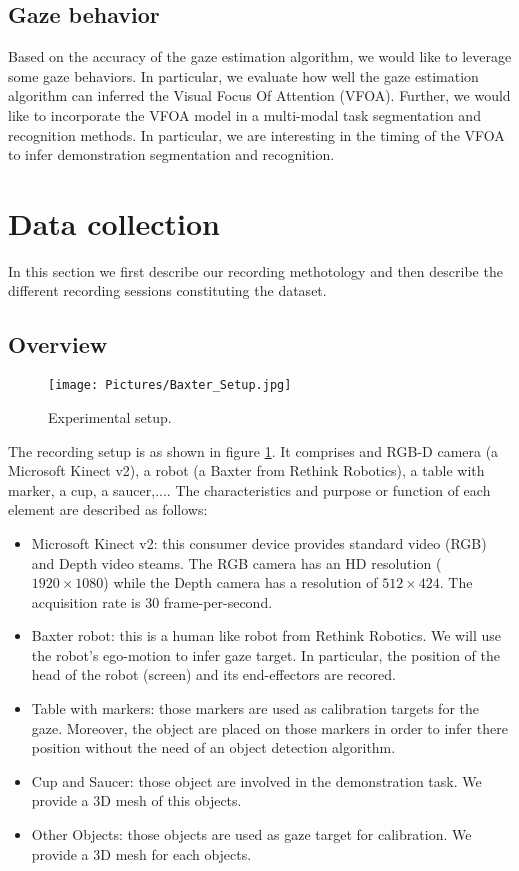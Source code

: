 \documentclass[11pt,a4paper]{article}
\begin{document}
\subsection{Gaze behavior}
Based on the accuracy of the gaze estimation algorithm, we would like to leverage some gaze behaviors. In particular, we evaluate how well the gaze estimation algorithm can inferred the Visual Focus Of Attention (VFOA). Further, we would like to incorporate the VFOA model in a multi-modal task segmentation and recognition methods. In particular, we are interesting in the timing of the VFOA to infer demonstration segmentation and recognition.

\section{Data collection}
\label{Data_Collection}
In this section we first describe our recording methotology and then describe the different recording sessions constituting the dataset.
\subsection{Overview}
\label{Overview}
\begin{figure}[!ht]
\begin{center}
\texttt{[image: Pictures/Baxter\_Setup.jpg]}
\end{center}
\caption{Experimental setup. \label{Experimental_Setup}}
\end{figure}
The recording setup is as shown in figure \ref{Experimental_Setup}. It comprises and RGB-D camera (a Microsoft Kinect v2), a robot (a Baxter from Rethink Robotics), a table with marker, a cup, a saucer,.... The characteristics and purpose or function of each element are described as follows:
\begin{itemize}
\item Microsoft Kinect v2: this consumer device provides standard video (RGB) and Depth video steams. The RGB camera has an HD resolution ($1920 \times 1080$) while the Depth camera has a resolution of $512 \times 424$. The acquisition rate is 30 frame-per-second.
\item Baxter robot: this is a human like robot from Rethink Robotics. We will use the robot's ego-motion to infer gaze target. In particular, the position of the head of the robot (screen) and its end-effectors are recored.
\item Table with markers: those markers are used as calibration targets for the gaze. Moreover, the object are placed on those markers in order to infer there position without the need of an object detection algorithm.
\item Cup and Saucer: those object are involved in the demonstration task. We provide a 3D mesh of this objects.
\item Other Objects: those objects are used as gaze target for calibration. We provide a 3D mesh for each objects.
\end{itemize}
\end{document}
